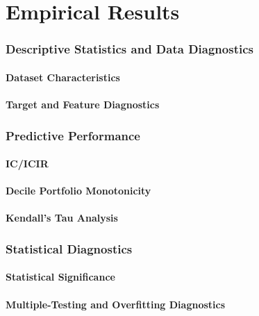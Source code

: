 
\part{Empirical Results}
\label{results}

\section{Descriptive Statistics and Data Diagnostics}

\subsection{Dataset Characteristics}

\subsection{Target and Feature Diagnostics}

\section{Predictive Performance}

\subsection{\acs{IC}/\acs{ICIR}}

\subsection{Decile Portfolio Monotonicity}

\subsection{Kendall's Tau Analysis}

\section{Statistical Diagnostics}

\subsection{Statistical Significance}

\subsection{Multiple-Testing and Overfitting Diagnostics}

